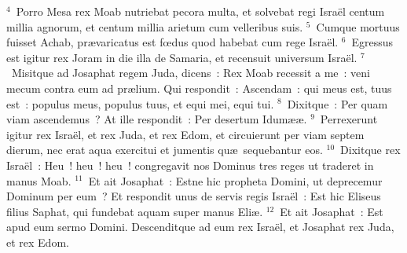 ${}^{4}$~Porro Mesa rex Moab nutriebat pecora multa, et solvebat regi Isra\"el centum millia agnorum, et centum millia arietum cum velleribus suis.
${}^{5}$~Cumque mortuus fuisset Achab, pr\ae varicatus est fœdus quod habebat cum rege Isra\"el.
${}^{6}$~Egressus est igitur rex Joram in die illa de Samaria, et recensuit universum Isra\"el.
${}^{7}$~Misitque ad Josaphat regem Juda, dicens~: Rex Moab recessit a me~: veni mecum contra eum ad pr\ae lium. Qui respondit~: Ascendam~: qui meus est, tuus est~: populus meus, populus tuus, et equi mei, equi tui.
${}^{8}$~Dixitque~: Per quam viam ascendemus~? At ille respondit~: Per desertum Idum\ae \ae .
${}^{9}$~Perrexerunt igitur rex Isra\"el, et rex Juda, et rex Edom, et circuierunt per viam septem dierum, nec erat aqua exercitui et jumentis qu\ae\ sequebantur eos.
${}^{10}$~Dixitque rex Isra\"el~: Heu~! heu~! heu~! congregavit nos Dominus tres reges ut traderet in manus Moab.
${}^{11}$~Et ait Josaphat~: Estne hic propheta Domini, ut deprecemur Dominum per eum~? Et respondit unus de servis regis Isra\"el~: Est hic Eliseus filius Saphat, qui fundebat aquam super manus Eli\ae .
${}^{12}$~Et ait Josaphat~: Est apud eum sermo Domini. Descenditque ad eum rex Isra\"el, et Josaphat rex Juda, et rex Edom.


